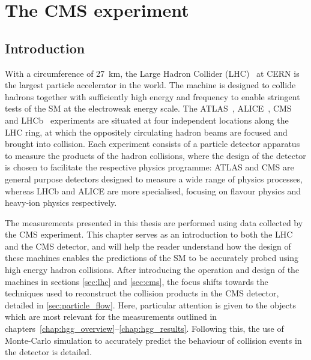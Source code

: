 \chapter{The CMS experiment}
\label{chap:cms}

\section{Introduction}
With a circumference of 27~km, the Large Hadron Collider (LHC)~\cite{1748-0221-3-08-S08001} at CERN is the largest particle accelerator in the world. The machine is designed to collide hadrons together with sufficiently high energy and frequency to enable stringent tests of the SM at the electroweak energy scale. The ATLAS~\cite{Aad:2008zzm}, ALICE~\cite{Aamodt:2008zz}, CMS~\cite{Chatrchyan:2008zzk} and LHCb~\cite{Alves:2008zz} experiments are situated at four independent locations along the LHC ring, at which the oppositely circulating hadron beams are focused and brought into collision. Each experiment consists of a particle detector apparatus to measure the products of the hadron collisions, where the design of the detector is chosen to facilitate the respective physics programme: ATLAS and CMS are general purpose detectors designed to measure a wide range of physics processes, whereas LHCb and ALICE are more specialised, focusing on flavour physics and heavy-ion physics respectively. 

The measurements presented in this thesis are performed using data collected by the CMS experiment. This chapter serves as an introduction to both the LHC and the CMS detector, and will help the reader understand how the design of these machines enables the predictions of the SM to be accurately probed using high energy hadron collisions. After introducing the operation and design of the machines in sections \ref{sec:lhc} and \ref{sec:cms}, the focus shifts towards the techniques used to reconstruct the collision products in the CMS detector, detailed in \ref{sec:particle_flow}. Here, particular attention is given to the objects which are most relevant for the \Hgg measurements outlined in chapters~\ref{chap:hgg_overview}--\ref{chap:hgg_results}. Following this, the use of Monte-Carlo simulation to accurately predict the behaviour of collision events in the detector is detailed. 

